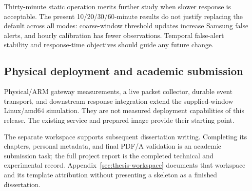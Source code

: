 Thirty-minute static operation merits further study when slower response is
acceptable. The present 10/20/30/60-minute results do not justify replacing the
default across all modes: coarse-window threshold updates increase Samsung false
alerts, and hourly calibration has fewer observations. Temporal false-alert
stability and response-time objectives should guide any future change.

\subsection{Physical deployment and academic submission}

Physical/ARM gateway measurements, a live packet collector, durable event
transport, and downstream response integration extend the supplied-window
Linux/amd64 simulation. They are not measured deployment capabilities of this
release. The existing service and prepared image provide their starting point.

The separate  workspace supports subsequent dissertation writing.
Completing its chapters, personal metadata, and final PDF/A validation is an
academic submission task; the full project report is the completed technical
and experimental record. Appendix~\ref{sec:thesis-workspace} documents that
workspace and its template attribution without presenting a skeleton as a
finished dissertation.
